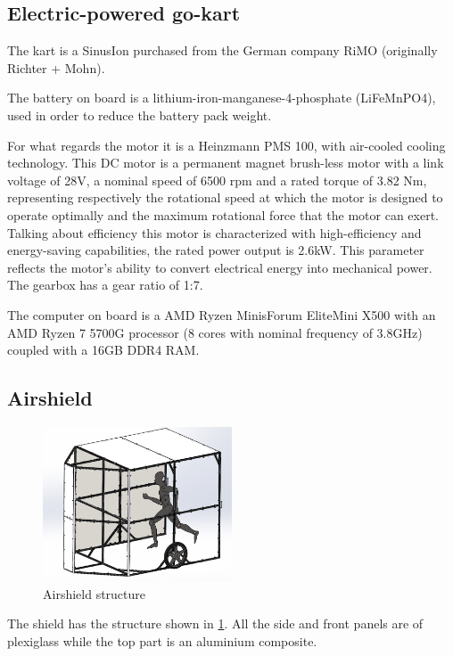 \documentclass[a4paper,12pt,oneside]{book}
\begin{document}
\subsection*{Electric-powered go-kart}
The kart is a SinusIon purchased from the German company RiMO (originally Richter + Mohn). 

\bigskip
The battery on board is a lithium-iron-manganese-4-phosphate (LiFeMnPO4), used in order to reduce the battery pack weight.

\bigskip
For what regards the motor it is a Heinzmann PMS 100, with air-cooled cooling technology. 
This DC motor is a permanent magnet brush-less motor with a link voltage of 28V, a nominal speed of 6500 rpm and a rated torque of 3.82 Nm, representing respectively the rotational speed at which the motor is designed to operate optimally and the maximum rotational force that the motor can exert.
Talking about efficiency this motor is characterized with high-efficiency and energy-saving capabilities, the rated power output is 2.6kW. 
This parameter reflects the motor's ability to convert electrical energy into mechanical power.
The gearbox has a gear ratio of 1:7.

\bigskip
The computer on board is a AMD Ryzen MinisForum EliteMini X500 with an AMD Ryzen 7 5700G processor (8 cores with nominal frequency of 3.8GHz) coupled with a 16GB DDR4 RAM.

\subsection*{Airshield}

\begin{figure}
	\centering
	\includegraphics[width=0.5\textwidth]{Shield_structure.png}
\caption{Airshield structure}
\label{Shield_structure}
\end{figure}

The shield has the structure shown in \ref{Shield_structure}.
All the side and front panels are of plexiglass while the top part is an aluminium composite.
\end{document}
